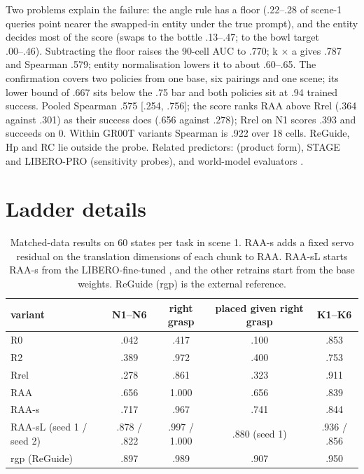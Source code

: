 Two problems explain the failure: the angle rule has a floor (.22--.28 of scene-1 queries point nearer the swapped-in entity under the true prompt), and the entity decides most of the score (swaps to the bottle .13--.47; to the bowl target .00--.46). Subtracting the floor raises the 90-cell AUC to .770; k $\times$ a gives .787 and Spearman .579; entity normalisation lowers it to about .60--.65. The confirmation covers two policies from one base, six pairings and one scene; its lower bound of .667 sits below the .75 bar and both policies sit at .94 trained success. Pooled Spearman .575 [.254, .756]; the score ranks RAA above Rrel (.364 against .301) as their success does (.656 against .278); Rrel on N1 scores .393 and succeeds on 0. Within GR00T variants Spearman is .922 over 18 cells. ReGuide, Hp and RC lie outside the probe. Related predictors: \citet{okawa2310} (product form), STAGE \citep{stage2609} and LIBERO-PRO (sensitivity probes), and world-model evaluators \citep{veo2512}.

\section{Ladder details}
\label{app:H}

\begin{table}[h]
\caption{Matched-data results on 60 states per task in scene 1. RAA-s adds a fixed servo residual on the translation dimensions of each chunk to RAA. RAA-sL starts RAA-s from the LIBERO-fine-tuned \pifive, and the other retrains start from the base weights. ReGuide (rgp) is the external reference.}
\label{tab:ladder}
\centering
\footnotesize
\begin{tabular}{@{}lcccc@{}}
\toprule
variant & N1--N6 & right grasp & placed given right grasp & K1--K6 \\
\midrule
R0 & .042 & .417 & .100 & .853 \\
R2 & .389 & .972 & .400 & .753 \\
Rrel & .278 & .861 & .323 & .911 \\
RAA & .656 & 1.000 & .656 & .839 \\
RAA-s & .717 & .967 & .741 & .844 \\
RAA-sL (seed 1 / seed 2) & .878 / .822 & .997 / 1.000 & .880 (seed 1) & .936 / .856 \\
rgp (ReGuide) & .897 & .989 & .907 & .950 \\
\bottomrule
\end{tabular}
\end{table}

